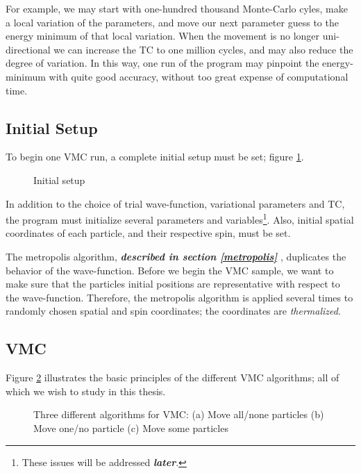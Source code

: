 For example, we may start with one-hundred thousand
Monte-Carlo cyles, make a local variation of the parameters, and move
our next parameter guess to the energy minimum of that local
variation. When the movement is no longer uni-directional we can
increase the TC to one million cycles, and may also reduce the degree
of variation. In this way, one run of the program may pinpoint
the energy-minimum with quite good accuracy, without too great expense
of computational time.

\subsection{Initial Setup}

To begin one VMC run, a complete initial setup must be set; figure
\ref{initial_setup}. 

\begin{figure}[hbtp]
\begin{center}
  \caption{Initial setup}
  \label{initial_setup}
\end{center}
\end{figure}

In addition to the choice of trial wave-function, variational
parameters and TC, the program must initialize several parameters and
variables\footnote{These issues will be addressed {\bf
    \emph{later}}. }. Also, initial spatial coordinates of each
particle, and their respective spin, must be set.

The metropolis algorithm, {\bf \emph{described in
    section \ref{metropolis} }}, duplicates the behavior of the
wave-function. Before we begin the VMC sample, we want to make sure
that the particles initial positions are representative with respect
to the wave-function. Therefore, the metropolis algorithm is applied
several times to randomly chosen spatial and spin coordinates; the
coordinates are \emph{thermalized}.


\subsection{VMC}

Figure \ref{vmc} illustrates the basic principles of the different VMC
algorithms; all of which we wish to study in this thesis. 


\begin{figure}[hbtp]
\begin{center}
  
  \caption{Three different algorithms for VMC: \newline
  (a) Move all/none particles \newline
  (b) Move one/no particle \newline
  (c) Move some particles}
  \label{vmc}
\end{center}
\end{figure}

